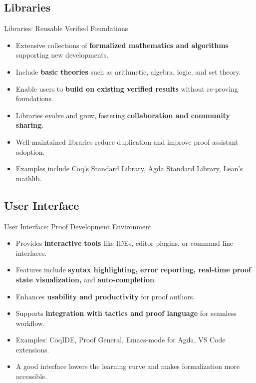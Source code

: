 \documentclass[aspectratio=169, 12pt]{beamer}
\begin{document}
\subsection*{Libraries}
\begin{frame}{Libraries: Reusable Verified Foundations}
\begin{itemize}
    \item Extensive collections of \textbf{formalized mathematics and algorithms} supporting new developments.
    \item Include \textbf{basic theories} such as arithmetic, algebra, logic, and set theory.
    \item Enable users to \textbf{build on existing verified results} without re-proving foundations.
    \item Libraries evolve and grow, fostering \textbf{collaboration and community sharing}.
    \item Well-maintained libraries reduce duplication and improve proof assistant adoption.
    \item Examples include Coq’s Standard Library, Agda Standard Library, Lean’s mathlib.
\end{itemize}
\end{frame}
\subsection*{User Interface}
\begin{frame}{User Interface: Proof Development Environment}
\begin{itemize}
    \item Provides \textbf{interactive tools} like IDEs, editor plugins, or command line interfaces.
    \item Features include \textbf{syntax highlighting, error reporting, real-time proof state visualization,} and \textbf{auto-completion}.
    \item Enhances \textbf{usability and productivity} for proof authors.
    \item Supports \textbf{integration with tactics and proof language} for seamless workflow.
    \item Examples: CoqIDE, Proof General, Emacs-mode for Agda, VS Code extensions.
    \item A good interface lowers the learning curve and makes formalization more accessible.
\end{itemize}
\end{frame}
\end{document}
